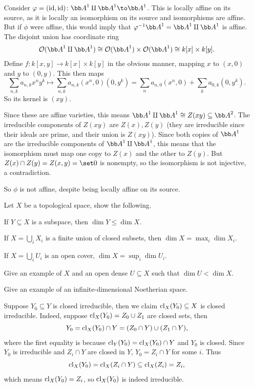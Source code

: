     \item Consider $\phi=(\id,\id)\colon\bA^1\amalg\bA^1\to\bA^1$.
    This is locally affine on its source, as it is locally an isomorphism on its source and isomorphisms are affine.
    But if $\phi$ were affine, this would imply that $\phi^{-1}\bA^1=\bA^1\amalg\bA^1$ is affine.
    The disjoint union has coordinate ring
    $$ \O(\bA^1\amalg\bA^1) \cong \O(\bA^1)\times\O(\bA^1) \cong k[x]\times k[y] . $$
    Define $f\colon k[x,y]\to k[x]\times k[y]$ in the obvious manner, mapping $x$ to $(x,0)$ and $y$ to $(0,y)$.
    This then maps
    $$ \sum_{n,k}a_{n,k}x^ny^k \mapsto \sum_{n,k}a_{n,k}(x^n,0)(0,y^k) = \sum_na_{n,0}(x^n,0) + \sum_ka_{0,k}(0,y^k) . $$
    So its kernel is $(xy)$.

    Since these are affine varieties, this means $\bA^1\amalg\bA^1\cong Z(xy)\subseteq\bA^2$.
    The irreducible components of $Z(xy)$ are $Z(x),Z(y)$ (they are irreducible since their ideals are prime, and their union is $Z(xy)$).
    Since both copies of $\bA^1$ are the irreducible components of $\bA^1\amalg\bA^1$, this means that the isomorphism must map
    one copy to $Z(x)$ and the other to $Z(y)$.
    But $Z(x)\cap Z(y)=Z(x,y)=\set0$ is nonempty, so the isomorphism is not injective, a contradiction.

    So $\phi$ is not affine, despite being locally affine on its source.
\eenum


\bprob

    Let $X$ be a topological space, show the following.
    \benum
        \item If $Y\subseteq X$ is a subspace, then $\dim Y\leq\dim X$.
        \item If $X=\bigcup_iX_i$ is a finite union of closed subsets, then $\dim X=\max_i\dim X_i$.
        \item If $X=\bigcup_iU_i$ is an open cover, $\dim X=\sup_i\dim U_i$.
        \item Give an example of $X$ and an open dense $U\subseteq X$ such that $\dim U<\dim X$.
        \item Give an example of an infinite-dimensional Noetherian space.
    \eenum

\eprob

\benum
    \item Suppose $Y_0\subseteq Y$ is closed irreducible, then we claim ${\rm cl}_X(Y_0)\subseteq X$ is closed irreducible.
    Indeed, suppose ${\rm cl}_X(Y_0)=Z_0\cup Z_1$ are closed sets, then
    $$ Y_0 = {\rm cl}_X(Y_0)\cap Y = (Z_0\cap Y) \cup (Z_1\cap Y) , $$
    where the first equality is because ${\rm cl}_Y(Y_0)={\rm cl}_X(Y_0)\cap Y$ and $Y_0$ is closed.
    Since $Y_0$ is irreducible and $Z_i\cap Y$ are closed in $Y$, $Y_0=Z_i\cap Y$ for some $i$.
    Thus
    $$ {\rm cl}_X(Y_0) = {\rm cl}_X(Z_i\cap Y) \subseteq {\rm cl}_X(Z_i) = Z_i , $$
    which means ${\rm cl}_X(Y_0)=Z_i$, so ${\rm cl}_X(Y_0)$ is indeed irreducible.

